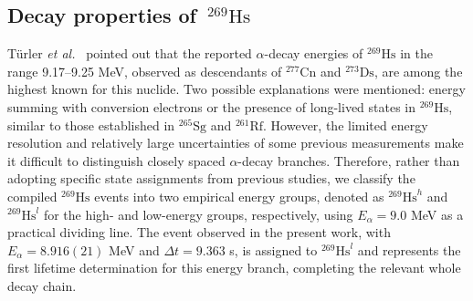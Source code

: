 \documentclass[final,5p,times,twocolumn,number,sort&compress]{elsarticle}
\begin{document}

\subsection{\texorpdfstring{Decay properties of~$^{269}\mathrm{Hs}$}{Decay properties of 269Hs}}

T\"urler \textit{et al.}~\cite{turlerNuclearStructureReaction2012} pointed out that the reported $\alpha$-decay energies of $^{269}\mathrm{Hs}$ in the range 9.17--9.25 MeV, observed as descendants of $^{277}\mathrm{Cn}$ and $^{273}\mathrm{Ds}$, are among the highest known for this nuclide. Two possible explanations were mentioned: energy summing with conversion electrons or the presence of long-lived states in $^{269}\mathrm{Hs}$, similar to those established in $^{265}\mathrm{Sg}$ and $^{261}\mathrm{Rf}$. However, the limited energy resolution and relatively large uncertainties of some previous measurements make it difficult to distinguish closely spaced $\alpha$-decay branches. Therefore, rather than adopting specific state assignments from previous studies, we classify the compiled $^{269}\mathrm{Hs}$ events into two empirical energy groups, denoted as $^{269}\mathrm{Hs}^{h}$ and $^{269}\mathrm{Hs}^{l}$ for the high- and low-energy groups, respectively, using $E_\alpha=9.0$ MeV as a practical dividing line.
The event observed in the present work, with $E_\alpha=8.916(21)$ MeV and $\Delta t=9.363$ s, is assigned to $^{269}\mathrm{Hs}^{l}$ and represents the first lifetime determination for this energy branch, completing the relevant whole decay chain.
\end{document}
